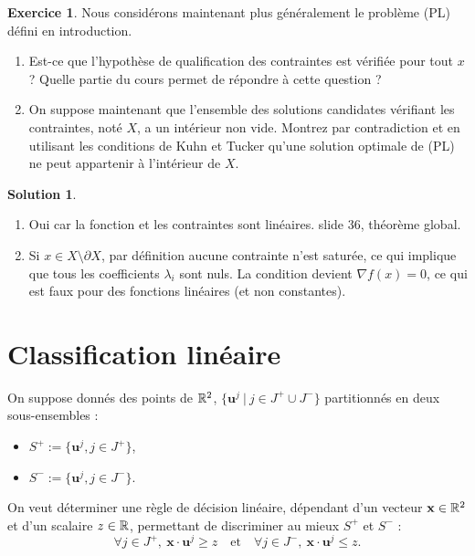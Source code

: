 \documentclass[a4paper,francais]{article}
\newcommand{\R}{{\ensuremath\mathbb{R}}}
\theoremstyle{definition}
\newtheorem{exercice}{Exercice}[section]
\newtheorem*{solution}{Solution}
\begin{document}
\begin{exercice}
  Nous considérons maintenant plus généralement le problème (PL) défini
  en introduction. 
  \begin{enumerate}
  \item Est-ce que l'hypothèse de qualification des contraintes est vérifiée
    pour tout $x$ ? Quelle partie du cours permet de répondre à cette question ?
  \item On suppose maintenant que l'ensemble des solutions candidates vérifiant
    les contraintes, noté $X$, a un intérieur non vide. Montrez par contradiction et
    en utilisant les conditions de Kuhn et Tucker qu'une solution optimale de (PL)
    ne peut appartenir à l'intérieur de $X$.
  \end{enumerate}
\end{exercice}

\begin{solution}
  \begin{enumerate}
  \item Oui car la fonction et les contraintes sont linéaires. slide 36, théorème global. 
  \item Si $x \in X \setminus \partial X$, par définition aucune contrainte n'est saturée,
  ce qui implique que tous les coefficients $\lambda_i$ sont nuls. La condition
  devient ${\nabla f}(x) = 0$, ce qui est faux pour des fonctions linéaires (et non
  constantes).
  \end{enumerate}
\end{solution}

\section{Classification linéaire}
\label{sec:classif}

\let\vec\mathbf

On suppose donnés des points de $\R^2$, $\{\vec{u}^j \ | \ {j \in J^+ \cup J^-} \}$
partitionnés en deux sous-ensembles :
\begin{itemize}
\item $S^+ := \{ \vec{u}^j, j \in J^+ \}$,
\item $S^- := \{ \vec{u}^j, j \in J^- \}$.
\end{itemize}
On veut déterminer une règle de décision linéaire, dépendant d'un vecteur $\vec{x} \in \R^2$
et d'un scalaire $z \in \R$, permettant de discriminer au mieux $S^+$ et $S^-$ :
\begin{equation}
  \label{eq:regle}
\forall j \in J^+, \ \vec{x} \cdot \vec{u}^j \geq z
\quad \text{et} \quad
\forall j \in J^-, \ \vec{x} \cdot \vec{u}^j \leq z.
\end{equation}
\end{document}
